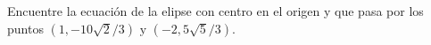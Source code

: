 \item Encuentre la ecuación de la elipse con centro en el origen y que pasa por los puntos $(1, -10\sqrt{2}/3) \text{ y } (-2, 5\sqrt{5}/3)$.
